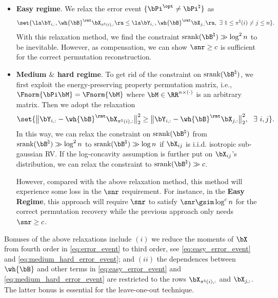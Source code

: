 \documentclass[11pt]{article}
\def \bPitrue {\bPi^{\natural}}
\def \bBtrue {\bB^{\natural}}
\def \bPiopt {\bPi^{\opt}}
\def\srank#1{\textup{srank}(#1)}
\begin{document}
\begin{itemize}
\item
\textbf{Easy regime}.
We relax the error event $\{\bPiopt\neq \bPitrue\}$ as
\begin{align}
\label{eq:easy_error_event}	
\set{ \la \bY_{i, :},  \wh{\bB}^{\rmt}\bX_{\pi^{\natural}(i), :} \ra
\leq \la \bY_{i, :}, \wh{\bB}^{\rmt} \bX_{j, :} \ra,~\exists~1\leq \pi^{\natural}(i) \neq  j \leq n}.
\end{align}
With this relaxation method, we find the constraint
$\srank{\bBtrue} \gg \log^2 n$ to be inevitable. However, as compensation, we can show $\snr\geq c$ is sufficient for the correct permutation reconstruction.


\item
\textbf{Medium $\&$ hard regime}.
To get rid of the constraint on $\srank{\bBtrue}$, we first exploit the energy-preserving property permutation matrix, i.e., $\Fnorm{\bPi \bM} = \Fnorm{\bM}$ where $\bM \in \RR^{n\times (\cdot)}$ is an arbitrary matrix.
Then we adopt the relaxation
\begin{align}
\label{eq:medium_hard_error_event}	
\set{\big\|\bY_{i, :} - \wh{\bB}^{\rmt}\bX_{\pi^{\natural}(i), :} \big\|_{2}^2 \geq \big\|\bY_{i, :} - \wh{\bB}^{\rmt}\bX_{j, :} \big\|_{2}^2,~~\exists~i, j}.
\end{align}
In this way, we can relax the constraint on $\srank{\bBtrue}$ from
$\srank{\bBtrue} \gg \log^2 n$ to $\srank{\bBtrue}\gg \log n$ if
$\bX_{ij}$ is i.i.d. isotropic sub-gaussian RV. If the log-concavity assumption is further put on $\bX_{ij}$'s distribution, we can relax the constraint to $\srank{\bBtrue}\gg c$.

However, compared with the above relaxation method, this method will experience some
loss in the $\snr$ requirement. For instance, in the \textbf{Easy Regime},
this approach will require $\snr$ to satisfy  $\snr \gsim \log^c n$
for the correct permutation recovery while the previous approach only needs
$\snr\geq c$.
\end{itemize}

Bonuses of the above relaxations include $(i)$ we reduce the moments of $\bX$
from fourth order in \eqref{eq:error_event} to third order, see \eqref{eq:easy_error_event} and \eqref{eq:medium_hard_error_event}; and $(ii)$ the dependences between $\wh{\bB}$ and other
terms in \eqref{eq:easy_error_event} and \eqref{eq:medium_hard_error_event} are restricted to the rows $\bX_{\pi^{\natural}(i), :}$ and $\bX_{j, :}$. The latter bonus is essential for the leave-one-out technique.
\end{document}
